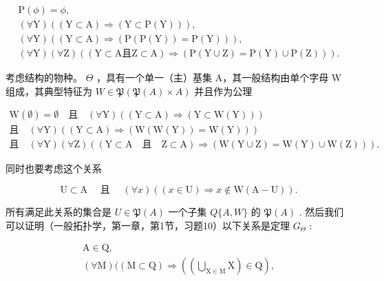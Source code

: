 \[
\begin{array}{c} \mathrm{P} (\phi) = \phi , \\ (\forall \mathrm{Y}) ((\mathrm{Y} \subset \mathrm{A}) \Longrightarrow (\mathrm{Y} \subset \mathrm{P} (\mathrm{Y}))), \\ (\forall \mathrm{Y}) ((\mathrm{Y} \subset \mathrm{A}) \Longrightarrow (\mathrm{P} (\mathrm{P} (\mathrm{Y})) = \mathrm{P} (\mathrm{Y}))), \\ (\forall \mathrm{Y}) (\forall \mathrm{Z}) ((\mathrm{Y} \subset \mathrm{A} \text {且} \mathrm{Z} \subset \mathrm{A}) \Longrightarrow (\mathrm{P} (\mathrm{Y} \cup \mathrm{Z}) = \mathrm{P} (\mathrm{Y}) \cup \mathrm{P} (\mathrm{Z}))). \end{array}
\]

考虑结构的物种。 \(\Theta\) ，具有一个单一（主）基集 A，其一般结构由单个字母 W 组成，其典型特征为 \(W \in \mathfrak{P}(\mathfrak{P}(A) \times A)\) 并且作为公理

\[
\begin{array}{c} \mathrm{W} (\emptyset) = \emptyset \quad \text {且} \quad (\forall \mathrm{Y}) ((\mathrm{Y} \subset \mathrm{A}) \Longrightarrow (\mathrm{Y} \subset \mathrm{W} (\mathrm{Y}))) \\ \text {且} \quad (\forall \mathrm{Y}) ((\mathrm{Y} \subset \mathrm{A}) \Longrightarrow (\mathrm{W} (\mathrm{W} (\mathrm{Y})) = \mathrm{W} (\mathrm{Y}))) \\ \text {且} \quad (\forall \mathrm{Y}) (\forall \mathrm{Z}) ((\mathrm{Y} \subset \mathrm{A} \quad \text {且} \quad \mathrm{Z} \subset \mathrm{A}) \Longrightarrow (\mathrm{W} (\mathrm{Y} \cup \mathrm{Z}) = \mathrm{W} (\mathrm{Y}) \cup \mathrm{W} (\mathrm{Z}))). \end{array}
\]

同时也要考虑这个关系

\[
\mathrm{U} \subset \mathrm{A} \quad \text { 且 } \quad (\forall x) ((x \in \mathrm{U}) \Longrightarrow x \notin \mathrm{W} (\mathrm{A} - \mathrm{U})).
\]

所有满足此关系的集合是 \(U \in \mathfrak{P}(A)\) 一个子集 \(Q\{A, W\}\) 的 \(\mathfrak{P}(A)\) . 然后我们可以证明（一般拓扑学，第一章，第1节，习题10）以下关系是定理 \(G_{\Theta}\) :

\[
\begin{array}{c} \mathrm{A} \in \mathrm{Q}, \\ (\forall \mathrm{M}) ((\mathrm{M} \subset \mathrm{Q}) \Longrightarrow \left(\left(\bigcup_ {\mathrm{X} \in \mathrm{M}} \mathrm{X}\right) \in \mathrm{Q}\right), \end{array}
\]


